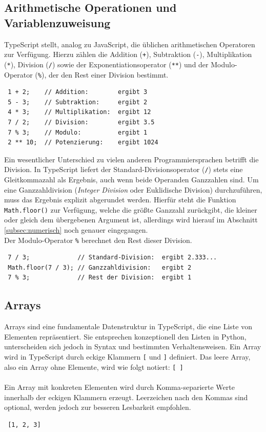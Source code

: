 \subsection{Arithmetische Operationen und Variablenzuweisung}
TypeScript stellt, analog zu JavaScript, die üblichen arithmetischen Operatoren zur Verfügung. Hierzu zählen die Addition (\texttt{+}), Subtraktion (\texttt{-}), Multiplikation (\texttt{*}), Division (\texttt{/}) sowie der Exponentiationsoperator (\texttt{**}) und der Modulo-Operator (\texttt{\%}), der den Rest einer Division bestimmt.

\begin{verbatim}
 1 + 2;    // Addition:        ergibt 3
 5 - 3;    // Subtraktion:     ergibt 2
 4 * 3;    // Multiplikation:  ergibt 12
 7 / 2;    // Division:        ergibt 3.5
 7 % 3;    // Modulo:          ergibt 1
 2 ** 10;  // Potenzierung:    ergibt 1024
\end{verbatim}

Ein wesentlicher Unterschied zu vielen anderen Programmiersprachen betrifft die Division. In TypeScript liefert der Standard-Divisionsoperator (\texttt{/}) stets eine Gleitkommazahl als Ergebnis, auch wenn beide Operanden Ganzzahlen sind. Um eine Ganzzahldivision (\textit{Integer Division} oder Euklidische Division) durchzuführen, muss das Ergebnis explizit abgerundet werden. Hierfür steht die Funktion \texttt{Math.floor()} zur Verfügung, welche die größte Ganzzahl zurückgibt, die kleiner oder gleich dem übergebenen Argument ist, allerdings wird hierauf im Abschnitt \ref{subsec:numerisch} noch genauer eingegangen.\\
Der Modulo-Operator \texttt{\%} berechnet den Rest dieser Division.

\begin{verbatim}
 7 / 3;             // Standard-Division:  ergibt 2.333...
 Math.floor(7 / 3); // Ganzzahldivision:   ergibt 2
 7 % 3;             // Rest der Division:  ergibt 1
\end{verbatim}

\subsection{Arrays}
\label{subsec:arrays}
Arrays sind eine fundamentale Datenstruktur in TypeScript, die eine Liste von Elementen repräsentiert. Sie entsprechen konzeptionell den Listen in Python, unterscheiden sich jedoch in Syntax und bestimmten Verhaltensweisen. Ein Array wird in TypeScript durch eckige Klammern \texttt{[} und \texttt{]} definiert. Das leere Array, also ein Array ohne Elemente, wird wie folgt notiert: \texttt{[ ]}
\\ \\
Ein Array mit konkreten Elementen wird durch Komma-separierte Werte innerhalb der eckigen Klammern erzeugt. Leerzeichen nach den Kommas sind optional, werden jedoch zur besseren Lesbarkeit empfohlen.
\begin{verbatim}
 [1, 2, 3]
\end{verbatim}

